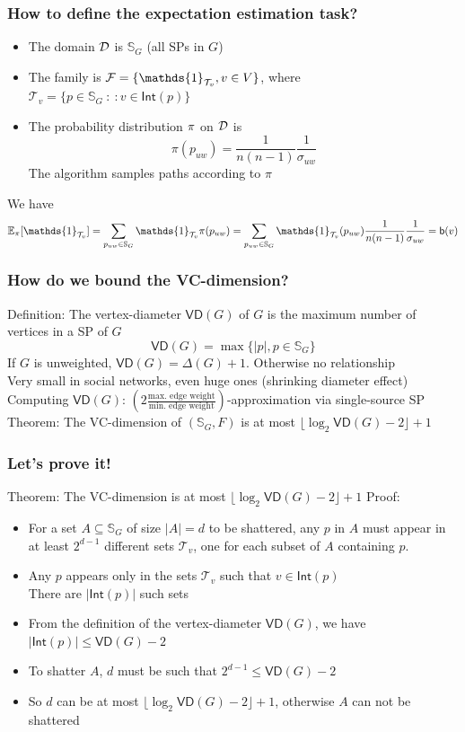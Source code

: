 \begin{frame}
  \frametitle{How to define the expectation estimation task?}
  \begin{itemize}
    \item The domain ${\cal D}$ is $\mathbb{S}_G$ (all SPs in $G$)\\
    \item The family is $\family=\{\mathds{1}_{\mathcal{T}_v}, v\in V\}$,
      where $\mathcal{T}_v=\{p\in\mathbb{S}_G ~:~: v\in\mathsf{Int}(p)\}$
    \item The probability distribution $\pi$ on ${\cal D}$ is
      \[
        \pi(p_{uw})=\frac{1}{n(n-1)}\frac{1}{\sigma_{uw}}
      \]
      The algorithm samples paths according to $\pi$
  \end{itemize}
  \vfill
  We have
  \[
    \expectation_\pi[\mathds{1}_{\mathcal{T}_v}]=\sum_{p_{uw}\in\mathbb{S}_G}\mathds{1}_{\mathcal{T}_v}\pi(p_{uw})=\sum_{p_{uw}\in\mathbb{S}_G}\mathds{1}_{\mathcal{T}_v}(p_{uw})\frac{1}{n(n-1)}\frac{1}{\sigma_{uw}}=\betw(v)
  \]
\end{frame}

\begin{frame}
  \frametitle{How do we bound the VC-dimension?}
  Definition: The vertex-diameter $\mathsf{VD}(G)$ of $G$ is the maximum
  number of vertices in a SP of $G$
  \[
    \mathsf{VD}(G)=\max\{|p|, p\in\mathbb{S}_G\}
  \]
  If $G$ is unweighted, $\mathsf{VD}(G)=\Delta(G)+1$. Otherwise no relationship\\
  Very small in social networks, even huge ones (shrinking diameter effect)
  \vfill
  Computing $\mathsf{VD}(G)$: $\left(2\frac{\mbox{max.~edge weight}}{\mbox{min.~edge
  weight}}\right)$-approximation via single-source SP
  \vfill
  Theorem: The VC-dimension of $(\mathbb{S}_G,F)$ is at most $\lfloor\log_2\mathsf{VD}(G)
  -2\rfloor +1$
\end{frame}

\begin{frame}
  \frametitle{Let's prove it!}
  Theorem: The VC-dimension is at most $\lfloor\log_2\mathsf{VD}(G)
  -2\rfloor +1$
  \vfill
  Proof:
  \begin{itemize}
    \item For a set $A\subseteq\mathbb{S}_G$ of size $|A|=d$ to be
      shattered, any $p$ in $A$ must appear in at least $2^{d-1}$
      different sets $\mathcal{T}_v$, one for each subset of $A$
      containing $p$.
    \item Any $p$ appears only in the sets $\mathcal{T}_v$ such that
      $v\in\mathsf{Int}(p)$\\
      \quad There are $|\mathsf{Int}(p)|$ such sets
    \item From the definition of the vertex-diameter $\mathsf{VD}(G)$, we have
      $|\mathsf{Int}(p)|\le\mathsf{VD}(G)-2$
    \item To shatter $A$, $d$ must be such that $2^{d-1}\le\mathsf{VD}(G)-2$
    \item So $d$ can be at most $\lfloor\log_2\mathsf{VD}(G) -2\rfloor +1$,
      otherwise $A$ can not be shattered
  \end{itemize}
\end{frame}

